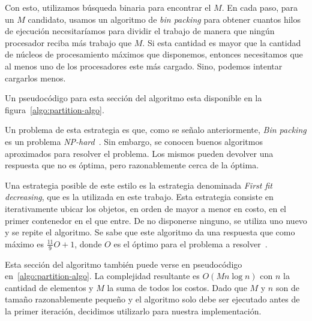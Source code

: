 Con esto, utilizamos b\'usqueda binaria para encontrar el $M$. En cada paso, para
un $M$ candidato, usamos un algoritmo de \textit{bin packing} para obtener
cuantos hilos de ejecuci\'on necesitar\'iamos para dividir el trabajo de manera que
ning\'un procesador reciba m\'as trabajo que $M$. Si esta cantidad es mayor que
la cantidad de n\'ucleos de procesamiento m\'aximos que disponemos, entonces
necesitamos que al menos uno de los procesadores este m\'as cargado. Sino, podemos
intentar cargarlos menos.

Un pseudoc\'odigo para esta secci\'on del algoritmo esta disponible en la figura~\ref{algo:partition-algo}.

Un problema de esta estrategia es que, como se se\~nalo anteriormente,
\textit{Bin packing} es un problema \textit{NP-hard}~\cite{NPCompleteness}. Sin
embargo, se conocen buenos algoritmos aproximados para resolver el problema. Los
mismos pueden devolver una respuesta que no es \'optima, pero razonablemente cerca
de la \'optima.

Una estrategia posible de este estilo es la estrategia denominada \textit{First
fit decreasing}, que es la utilizada en este trabajo. Esta estrategia consiste en
iterativamente ubicar los objetos, en orden de mayor a menor en costo,
en el primer contenedor en el que entre. De no disponerse ninguno, se utiliza
uno nuevo y se repite el algoritmo. Se sabe que este algoritmo da una respuesta
que como m\'aximo es $\frac{11}{9} O + 1$, donde $O$ es el \'optimo para el
problema a resolver~\cite{FFDDemo}.

Esta secci\'on del algoritmo tambi\'en puede verse en pseudoc\'odigo en~\ref{algo:partition-algo}.
La complejidad resultante es $O(M n \log n)$ con $n$ la cantidad de elementos y $M$ la suma
de todos los costos. Dado que $M$ y $n$ son de tama\~no razonablemente peque\~no y el algoritmo
solo debe ser ejecutado antes de la primer iteraci\'on, decidimos utilizarlo para
nuestra implementaci\'on.

